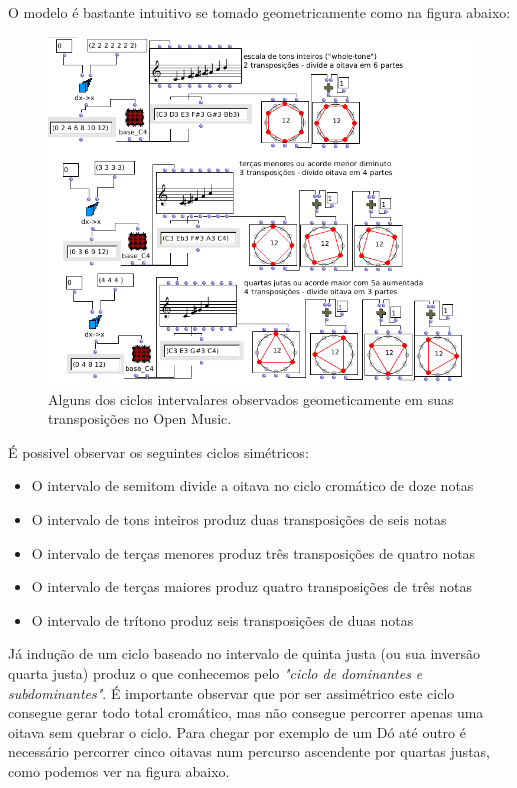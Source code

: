 \documentclass[
	12pt,				%
	openright,			%
	twoside,			%
	a4paper,			%
	english,			%
	french,				%
	spanish,			%
	brazil				%
	]{abntex2}
\begin{document}
O modelo é bastante intuitivo se tomado geometricamente como na figura abaixo:

\begin{figure}[!h]
	\caption{\label{fig_grafico}Alguns dos ciclos intervalares observados geometicamente em suas transposições no Open Music.  }
	\begin{center}
	    \includegraphics[scale=0.5]{ciclos/ciclosOM.png}
	\end{center}
\end{figure}

É possivel observar os seguintes ciclos simétricos:

\begin{itemize}
\item O intervalo de semitom divide a oitava no ciclo cromático de doze notas
\item O intervalo de tons inteiros produz duas transposições de seis notas
\item O intervalo de terças menores produz três transposições de quatro notas
\item O intervalo de terças maiores produz quatro transposições de três notas
\item O intervalo de trítono produz seis transposições de duas notas
\end{itemize}

Já indução de um ciclo baseado no intervalo de quinta justa (ou sua inversão quarta justa) produz o que conhecemos pelo \textit{"ciclo de dominantes e subdominantes"}. É importante observar que por ser assimétrico este ciclo consegue gerar todo total cromático, mas não consegue percorrer apenas uma oitava sem quebrar o ciclo. Para chegar por exemplo de um Dó até outro é necessário percorrer cinco oitavas num percurso ascendente por quartas justas, como podemos ver na figura abaixo.
\end{document}
